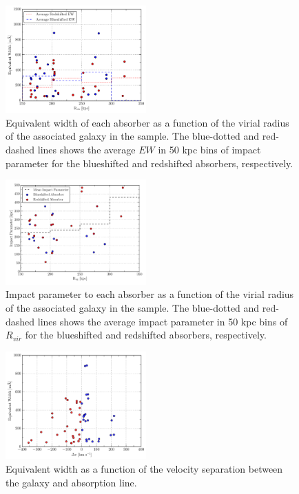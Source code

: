 \documentclass[iop]{emulateapj-rtx4}
\begin{document}
\begin{figure}[h!]
        \centering
        \includegraphics[width=0.48\textwidth]{W(vir)_avgHistograms.pdf}
        \caption{\small{Equivalent width of each absorber as a function of the virial radius of the associated galaxy in the sample. The blue-dotted and red-dashed lines shows the average $EW$ in 50 kpc bins of impact parameter for the blueshifted and redshifted absorbers, respectively.}}
        \label{w_vir}
        \vspace{5pt}
\end{figure}

\begin{figure}[h!]
        \centering
        \includegraphics[width=0.48\textwidth]{impact(virial)_avgHist.pdf}
        \caption{\small{Impact parameter to each absorber as a function of the virial radius of the associated galaxy in the sample. The blue-dotted and red-dashed lines shows the average impact parameter in 50 kpc bins of $R_{vir}$ for the blueshifted and redshifted absorbers, respectively.}}
        \label{w_vir}
        \vspace{5pt}
\end{figure}


\begin{figure}[h!]
        \centering
        \includegraphics[width=0.48\textwidth]{W(vel_diff).pdf}
        \caption{\small{Equivalent width as a function of the velocity separation between the galaxy and absorption line.}}
        \label{W_veldif}
        \vspace{5pt}
\end{figure} 
\end{document}
